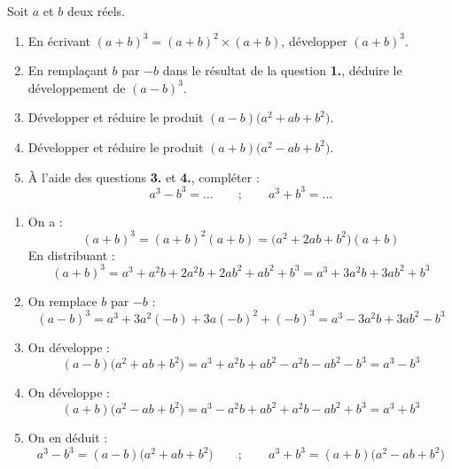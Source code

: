 \documentclass[10pt, a4paper]{article}
\begin{document}
\begin{Activite}[][20 min]
Soit $a$ et $b$ deux réels.
\begin{enumerate}
    \item En écrivant $(a+b)^3 = (a+b)^2 \times (a+b)$, développer $(a+b)^3$.
    
    \item En remplaçant $b$ par $-b$ dans le résultat de la question \textbf{1.}, déduire le développement de $(a-b)^3$.
\end{enumerate}

\begin{enumerate}
    \setcounter{enumi}{2}
    \item Développer et réduire le produit $(a-b)\big(a^2 + ab + b^2\big)$.
    
    \item Développer et réduire le produit $(a+b)\big(a^2 - ab + b^2\big)$.
    
    \item À l'aide des questions \textbf{3.} et \textbf{4.}, compléter :
    \[
        a^3 - b^3 = \dots \qquad ; \qquad a^3 + b^3 = \dots
    \]
\end{enumerate}
\end{Activite}

\begin{Solution}[ACTIVITÉ][2]
\begin{enumerate}
    \item On a :
    \[
        (a+b)^3 = (a+b)^2(a+b) = \big(a^2 + 2ab + b^2\big)(a+b)
    \]
    En distribuant :
    \[
     (a+b)^3   = a^3 + a^2 b + 2a^2 b + 2ab^2 + ab^2 + b^3 = a^3 + 3a^2 b + 3ab^2 + b^3
    \]

    \item On remplace $b$ par $-b$ :
    \[
        (a-b)^3 = a^3 + 3a^2(-b) + 3a(-b)^2 + (-b)^3 = a^3 - 3a^2 b + 3ab^2 - b^3
    \]

    \item On développe :
    \[
        (a-b)\big(a^2 + ab + b^2\big) = a^3 + a^2 b + ab^2 - a^2 b - ab^2 - b^3 = a^3 - b^3
    \]

    \item On développe :
    \[
        (a+b)\big(a^2 - ab + b^2\big) = a^3 - a^2 b + ab^2 + a^2 b - ab^2 + b^3 = a^3 + b^3
    \]

    \item On en déduit :
    \[
        a^3 - b^3 = (a-b)\big(a^2 + ab + b^2\big) \qquad ; \qquad a^3 + b^3 = (a+b)\big(a^2 - ab + b^2\big)
    \]
\end{enumerate}
\end{Solution}
\end{document}
